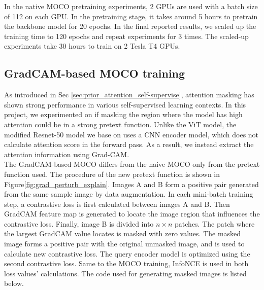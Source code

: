 \documentclass[12pt,twoside]{report}
\begin{document}
In the native MOCO pretraining experiments, 2 GPUs are used with a batch size of 112 on each GPU. In the pretraining stage, it takes around 5 hours to pretrain the backbone model for 20 epochs. In the final reported results, we scaled up the training time to 120 epochs and repeat experiments for 3 times. The scaled-up experiments take 30 hours to train on 2 Tesla T4 GPUs. 


\subsection{GradCAM-based MOCO training} \label{sec:gradcamMOCO}
As introduced in Sec \ref{sec:prior_attention_self-supervise}, attention masking has shown strong performance in various self-supervised learning contexts. In this project, we experimented on if masking the region where the model has high attention could be in a strong pretext function. Unlike the ViT model, the modified Resnet-50 model we base on uses a CNN encoder model, which does not calculate attention score in the forward pass. As a result, we instead extract the attention information using Grad-CAM. \\





The GradCAM-based MOCO differs from the naive MOCO only from the pretext function used. The procedure of the new pretext function is shown in Figure\ref{fig:grad_perturb_explain}. Images A and B form a positive pair generated from the same sample image by data augmentation. In each mini-batch training step, a contrastive loss is first calculated between images A and B. Then GradCAM feature map is generated to locate the image region that influences the contrastive loss. Finally, image B is divided into $n \times n$ patches. The patch where the largest GradCAM value locates is masked with zero values. The masked image forms a positive pair with the original unmasked image, and is used to calculate new contrastive loss. The query encoder model is optimized using the second contrastive loss. Same to the MOCO training, InfoNCE is used in both loss values' calculations. The code used for generating masked images is listed below. 
\end{document}
